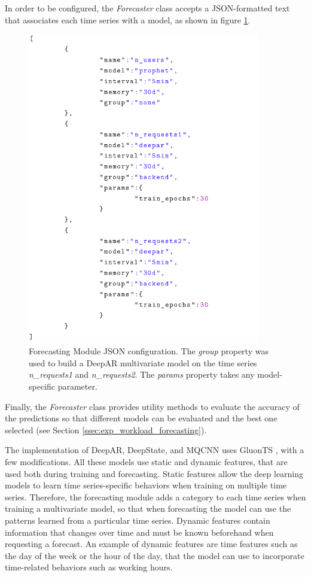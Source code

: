 \documentclass[a4paper, 12pt]{article} %
\begin{document}
	In order to be configured, the \textit{Forecaster} class accepts a JSON-formatted text that associates each time series with a model, as shown in figure \ref{fig:forecaster_cfg.png}.
	\begin{figure}[!b]
		\includegraphics[width=4in]{img/forecaster_cfg.png}
		\caption{Forecasting Module JSON configuration. The \textit{group} property was used to build a DeepAR multivariate model on the time series \textit{n\_requests1} and \textit{n\_requests2}. The \textit{params} property takes any model-specific parameter.}
		\label{fig:forecaster_cfg.png}
	\end{figure}
	Finally, the \textit{Forecaster} class provides utility methods to evaluate the accuracy of the predictions so that different models can be evaluated and the best one selected (see Section \ref{ssec:exp_workload_forecasting}).
	
	The implementation of DeepAR, DeepState, and MQCNN uses GluonTS \cite{GluonTS}, with a few modifications. All these models use static and dynamic features, that are used both during training and forecasting. Static features allow the deep learning models to learn time series-specific behaviors when training on multiple time series. Therefore, the forecasting module adds a category to each time series when training a multivariate model, so that when forecasting the model can use the patterns learned from a particular time series. Dynamic features contain information that changes over time and must be known beforehand when requesting a forecast. An example of dynamic features are time features such as the day of the week or the hour of the day, that the model can use to incorporate time-related behaviors such as working hours.
	
\end{document}
